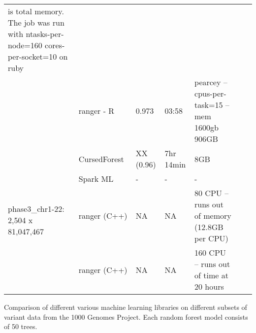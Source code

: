 \documentclass[11pt]{article}
\newcommand{\cursedforest}{{\sc CursedForest}}
\begin{document}
\begin{table}[!ht]
\begin{minipage}{\textwidth}
\begin{tabular}{|l|l|l|l|l|l|p{1cm}|}
{                                                                                                                                           is
                                                                                                                                           total
                                                                                                                                           memory. The
                                                                                                                                           job
                                                                                                                                           was
                                                                                                                                           run
                                                                                                                                           with
                                                                                                                                                   ntasks-per-node=160
                                                                                                                                           cores-per-socket=10
                                                                                                                                           on
                                                                                                                                           ruby
                                                                                                                                           }  \\
& ranger - R        &             0.973     &      03:58           &       pearcey --cpus-per-task=15 --mem 1600gb   906GB \\
\hline

\multirow{4}{*}{phase3\_chr1-22: 2,504 x 81,047,467} & \cursedforest\ & XX (0.96) & 7hr 14min & 8GB \\
& Spark ML & - & - & - \\
& ranger (C++)       &        NA     &        NA     &            80 CPU -- runs out of memory (12.8GB per CPU) \\
& ranger (C++)       &        NA     &        NA     &            160
                                                        CPU -- runs
                                                        out of time at
                                                        20 hours \\
\hline
\end{tabular}
\begin{flushleft} 
Comparison of different various machine learning libraries on different subsets of variant data 
from the 1000 Genomes Project.
Each random forest model consists of 50 trees.
\end{flushleft}
\label{table1}
\end{minipage}
\end{table}
\end{document}
